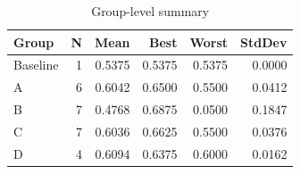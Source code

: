 \begin{table}[htbp]
\centering
\caption{Group-level summary}
\label{tab:group-summary}
\begin{tabular}{lrrrrr}
\toprule
\textbf{Group} & \textbf{N} & \textbf{Mean} & \textbf{Best} & \textbf{Worst} & \textbf{StdDev} \\
\midrule
Baseline & 1 & 0.5375 & 0.5375 & 0.5375 & 0.0000 \\
A & 6 & 0.6042 & 0.6500 & 0.5500 & 0.0412 \\
B & 7 & 0.4768 & 0.6875 & 0.0500 & 0.1847 \\
C & 7 & 0.6036 & 0.6625 & 0.5500 & 0.0376 \\
D & 4 & 0.6094 & 0.6375 & 0.6000 & 0.0162 \\
\bottomrule
\end{tabular}
\end{table}